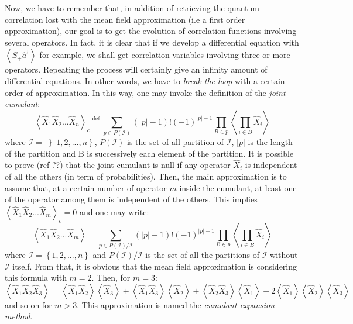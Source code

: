 \documentclass[11pt]{report}
\begin{document}
Now, we have to remember that, in addition of retrieving the quantum correlation lost with the mean field approximation (i.e a first order approximation), our goal is to get the evolution of correlation functions involving several operators. In fact, it is clear that if we develop a differential equation with $\left\langle\hat{S}_+ \hat{a}^\dagger\right\rangle$ for example, we shall get correlation variables involving three or more operators. Repeating the process will certainly give an infinity amount of differential equations. In other words, we have to \textit{break the loop} with a certain order of approximation. In this way, one may invoke the definition of the \textit{joint cumulant}:
\begin{equation}
\left\langle\hat{X}_1\hat{X}_2...\hat{X}_n\right\rangle_c \stackrel{\text{def}}{=} \sum_{p \in P(\mathcal{I})} (\vert p \vert - 1)!(-1)^{\vert p \vert -1} \prod_{B \in p} \left\langle \prod_{i \in B}\hat{X}_i\right\rangle
\end{equation}
where $\mathcal{I} = \left\rbrace 1,2, ..., n \right\rbrace$, $P(\mathcal{I})$ is the set of all partition of $\mathcal{I}$, $\vert p \vert$ is the length of the partition and B is successively each element of the partition. It is possible to prove (ref ??) that the joint cumulant is null if any operator $\hat{X}_i$ is independent of all the others (in term of probabilities). Then, the main approximation is to assume that, at a certain number of operator $m$ inside the cumulant, at least one of the operator among them is independent of the others. This implies $\left\langle\hat{X}_1\hat{X}_2...\hat{X}_m\right\rangle_c = 0$ and one may write:
\begin{equation}
\left\langle\hat{X}_1\hat{X}_2...\hat{X}_m\right\rangle = \sum_{p \in P(\mathcal{I})/\mathcal{I}} (\vert p \vert - 1)!(-1)^{\vert p \vert -1} \prod_{B \in p} \left\langle \prod_{i \in B}\hat{X}_i\right\rangle
\end{equation}
where $\mathcal{I} = \left\lbrace 1,2, ..., n \right\rbrace$ and $P(\mathcal{I})/\mathcal{I}$ is the set of all the partitions of $\mathcal{I}$ without $\mathcal{I}$ itself. From that, it is obvious that the mean field approximation is considering  this formula  with $m=2$. Then, for $m=3$:
\begin{equation}
\left\langle\hat{X}_1\hat{X}_2\hat{X}_3\right\rangle = \left\langle\hat{X}_1\hat{X}_2\right\rangle\left\langle\hat{X}_3\right\rangle + \left\langle\hat{X}_1\hat{X}_3\right\rangle\left\langle\hat{X}_2\right\rangle + \left\langle\hat{X}_2\hat{X}_3\right\rangle\left\langle\hat{X}_1\right\rangle - 2\left\langle\hat{X}_1\right\rangle\left\langle\hat{X}_2\right\rangle\left\langle\hat{X}_3\right\rangle
\end{equation}
and so on for $m>3$. This approximation is named the \textit{cumulant expansion method}.
\end{document}

